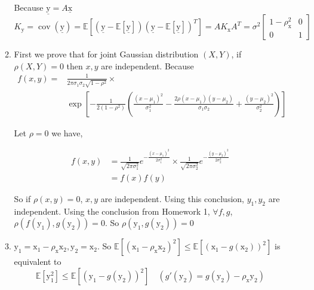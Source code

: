 \documentclass[a4paper]{article}
\begin{document}
\begin{enumerate}
\begin{enumerate}
  Because $\underline{\mathrm{y}} = A \underline{\mathrm{x}}$
  \begin{equation}
    K_{\mathrm{y}} = \operatorname{cov}(\underline{\mathrm{y}}) = \mathbb{E}\left[\left(\underline{\mathrm{y}} - \mathbb{E}[\underline{\mathrm{y}}]\right) \left(\underline{\mathrm{y}} - \mathbb{E}[\underline{\mathrm{y}}]\right)^T\right] = A K_{\mathrm{x}} A^T = \sigma^2  \begin{bmatrix}
      1-\rho_{\mathrm{x}}^2 & 0\\ 0 & 1 \end{bmatrix}
  \end{equation}

  \item First we prove that for joint Gaussian distribution $(X,Y)$, if $\rho(X,Y)= 0$ then $x,y$ are independent. Because
  \begin{equation}
    \begin{aligned}
      f(x, y)= & \frac{1}{2 \pi \sigma_{1} \sigma_{2} \sqrt{1-\rho^{2}}}  \times \\
      & \exp \left[-\frac{1}{2\left(1-\rho^{2}\right)}\left(\frac{\left(x-\mu_{1}\right)^{2}}{\sigma_{1}^{2}}-\frac{2 \rho\left(x-\mu_{1}\right)\left(y-\mu_{2}\right)}{\sigma_{1} \sigma_{2}}+\frac{\left(y-\mu_{2}\right)^{2}}{\sigma_{2}^{2}}\right)\right]
    \end{aligned}
  \end{equation}
  
  Let $\rho = 0$ we have,

  \begin{equation}
    \begin{aligned}
      f(x, y) & = \frac{1}{\sqrt{2\pi\sigma_1^2}} e^{-\frac{(x-\mu_1)^2}{2\sigma_1^2}} \times \frac{1}{\sqrt{2\pi\sigma_2^2}} e^{-\frac{(y-\mu_2)^2}{2\sigma_2^2}} \\
      & = f(x)f(y)
    \end{aligned}
  \end{equation}

  So if $\rho(x,y) = 0$, $x,y$ are independent. Using this conclusion, $y_1,y_2$ are independent. Using the conclusion from Homework 1, $\forall f,g$, $\rho(f(\mathrm{y}_1),g(\mathrm{y}_2)) = 0$. So  $\rho(\mathrm{y}_1,g(\mathrm{y}_2)) = 0$

  \item $\mathrm{y_1} = \mathrm{x}_1 - \rho_{\mathrm{x}}\mathrm{x}_2,\mathrm{y_2} = \mathrm{x}_2$. So $\mathbb{E}\left[\left(\mathrm{x}_{1}-\rho_{\mathrm{x}} \mathrm{x}_{2}\right)^{2}\right] \leqslant \mathbb{E}\left[\left(\mathrm{x}_{1}-g\left(\mathrm{x}_{2}\right)\right)^{2}\right]$ is equivalent to \begin{equation}
    \mathbb{E}\left[\mathrm{y}_1^2\right] \leqslant \mathbb{E}\left[\left(\mathrm{y}_{1}-g\left(\mathrm{y}_{2}\right)\right)^{2}\right] \quad \left( g'(\mathrm{y}_2) =  g(\mathrm{y}_2) - \rho_{\mathrm{x}}\mathrm{y}_2\right)
  \end{equation}


\end{enumerate}
\end{enumerate}
\end{document}
